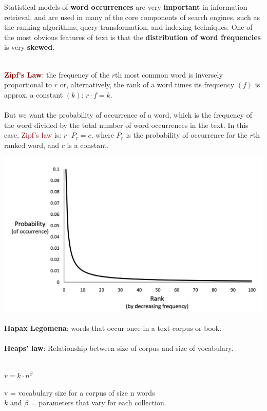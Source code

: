 Statistical models of \textbf{word occurrences} are very \textbf{important} in information retrieval, and are used in many of the core components of search engines, such as the ranking algorithms, query transformation, and indexing techniques. One of the most obvious features of text is that the \textbf{distribution of word frequencies} is very \textbf{skewed}. 
\\
\\
\begin{minipage}{.45\textwidth}
\textbf{\textcolor{Maroon}{Zipf's Law}}: the frequency of the $r$th most common word is inversely proportional to $r$ or, alternatively, the rank of a word times its frequency $(f)$ is approx. a constant $(k)$: $r \cdot f = k$.
\\
\\
But we want the probability of occurrence of a word, which is the frequency of the word divided by the total number of word occurrences in the text. In this case, \textcolor{Maroon}{Zipf's law} is: $r \cdot P_r = c$, where $P_r$ is the probability of occurrence for the $r$th ranked word, and $c$ is a constant.
\end{minipage}
\begin{minipage}{.45\textwidth}
  \includegraphics[scale=0.4]{figures/zipf.png}
\end{minipage}
\vspace{0.35cm}

\textbf{Hapax Legomena}: words that occur once in a text corpus or book.
\\
\\
\textbf{\textcolor{NavyBlue}{Heaps' law}}: Relationship between size of corpus and size of vocabulary.
\\
\\
\begin{minipage}{.3\textwidth}
\centering
$v = k \cdot n^\beta$
\end{minipage}
\begin{minipage}{.7\textwidth}
v = vocabulary size for a corpus of size n words \\
$k$ and $\beta$ = parameters that vary for each collection.
\end{minipage}
\vspace{0.25cm}

